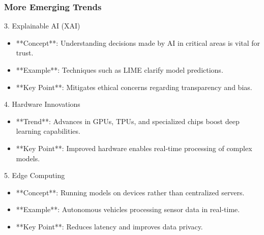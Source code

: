 \documentclass[aspectratio=169]{beamer}
\begin{document}
\begin{frame}[fragile]
    \frametitle{More Emerging Trends}
    \begin{block}{3. Explainable AI (XAI)}
        \begin{itemize}
            \item **Concept**: Understanding decisions made by AI in critical areas is vital for trust.
            \item **Example**: Techniques such as LIME clarify model predictions.
            \item **Key Point**: Mitigates ethical concerns regarding transparency and bias.
        \end{itemize}
    \end{block}

    \begin{block}{4. Hardware Innovations}
        \begin{itemize}
            \item **Trend**: Advances in GPUs, TPUs, and specialized chips boost deep learning capabilities.
            \item **Key Point**: Improved hardware enables real-time processing of complex models.
        \end{itemize}
    \end{block}

    \begin{block}{5. Edge Computing}
        \begin{itemize}
            \item **Concept**: Running models on devices rather than centralized servers.
            \item **Example**: Autonomous vehicles processing sensor data in real-time.
            \item **Key Point**: Reduces latency and improves data privacy.
        \end{itemize}
    \end{block}
\end{frame}
\end{document}
